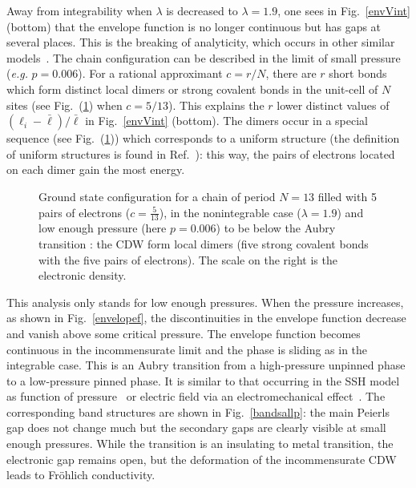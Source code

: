 \documentclass[]{revtex4-1}
\begin{document}
Away from integrability when $\lambda$ is decreased to $\lambda=1.9$, one sees in Fig.~\ref{envVint} (bottom) that the envelope function is no longer continuous but has gaps at several places. This is the breaking of analyticity, which occurs in other similar models~\cite{aubry_ledaeron,aubry_quemerais,quemerais}.
The chain configuration can be described in the limit of small pressure (\textit{e.g.} $p=0.006$). For a rational approximant $c=r/N$, there are $r$ short bonds which form distinct local dimers or strong covalent bonds in the unit-cell of $N$ sites (see Fig.~(\ref{exlatt}) when $c=5/13$). This explains the $r$ lower distinct values of $(\ell_i-\bar{\ell})/\bar{\ell}$ in Fig.~\ref{envVint} (bottom). The dimers occur in a special sequence (see Fig.~(\ref{exlatt})) which corresponds to a uniform structure (the definition of uniform structures is found in Ref.~\cite{Ducastelle}): this way, the pairs of electrons located on each dimer gain the most energy.
\begin{figure}[h] \begin{center}
   \end{center}
  \caption{Ground state configuration for a chain of period $N=13$ filled with 5 pairs of electrons ($c=\frac{5}{13}$), in the nonintegrable case ($\lambda=1.9$) and low enough pressure 
(here $p=0.006$) to be below the Aubry transition : the CDW form local dimers (five strong covalent bonds with the five pairs of electrons). The scale on the right is the electronic density.}
  \label{exlatt}
\end{figure}

This analysis only stands for low enough pressures. When the pressure increases, as shown in Fig.~\ref{envelopef}, the discontinuities in the envelope function decrease and vanish above some critical pressure. The envelope function becomes continuous in the incommensurate limit and the phase is sliding as in the integrable case. This is an Aubry transition from a high-pressure unpinned phase to a low-pressure pinned phase.   It is similar to that occurring in the SSH model as function of pressure~\cite{aubry_ledaeron,aubry_quemerais} or electric field via an electromechanical effect~\cite{quemerais}. The corresponding band structures are shown in  Fig.~\ref{bandsallp}: the main Peierls gap does not change much but the secondary gaps are clearly visible at small enough pressures. While the transition is an insulating to metal transition, the electronic gap remains open, but the deformation of the incommensurate CDW leads to Fr\"ohlich conductivity. 
\end{document}
